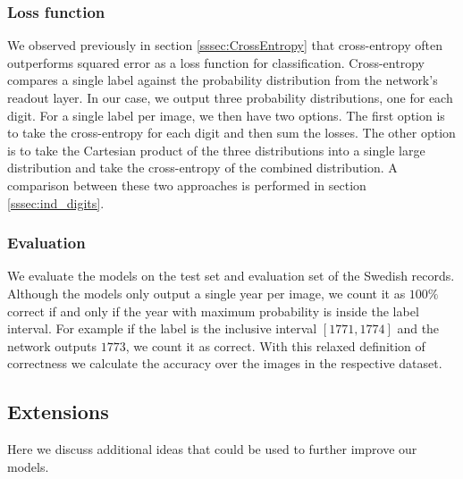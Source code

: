 


\subsubsection{Loss function}

We observed previously in section \ref{sssec:CrossEntropy} that cross-entropy often outperforms squared error as a loss function for classification. Cross-entropy compares a single label against the probability distribution from the network's readout layer. In our case, we output three probability distributions, one for each digit.
For a single label per image, we then have two options.
The first option is to take the cross-entropy for each digit and then sum the losses.
The other option is to take the Cartesian product of the three distributions into a single large distribution and take the cross-entropy of the combined distribution. A comparison between these two approaches is performed in section \ref{sssec:ind_digits}.

\subsubsection{Evaluation}

We evaluate the models on the test set and evaluation set of the Swedish records. Although the models only output a single year per image, we count it as $100\%$ correct if and only if the year with maximum probability is inside the label interval. For example if the label is the inclusive interval $[1771, 1774]$ and the network outputs $1773$, we count it as correct. With this relaxed definition of correctness we calculate the accuracy over the images in the respective dataset.



\subsection{Extensions}

Here we discuss additional ideas that could be used to further improve our models.

